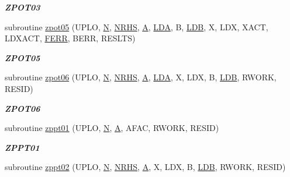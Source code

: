 \begin{DoxyCompactItemize}
\begin{DoxyCompactList}\small\item\em {\bfseries Z\+P\+O\+T03} \end{DoxyCompactList}\item 
subroutine \hyperlink{group__complex16__lin_gad3da0aadacd8621d7118250abd3e0101}{zpot05} (U\+P\+L\+O, \hyperlink{polmisc_8c_a0240ac851181b84ac374872dc5434ee4}{N}, \hyperlink{example__user_8c_aa0138da002ce2a90360df2f521eb3198}{N\+R\+H\+S}, \hyperlink{classA}{A}, \hyperlink{example__user_8c_ae946da542ce0db94dced19b2ecefd1aa}{L\+D\+A}, B, \hyperlink{example__user_8c_a50e90a7104df172b5a89a06c47fcca04}{L\+D\+B}, X, L\+D\+X, X\+A\+C\+T, L\+D\+X\+A\+C\+T, \hyperlink{superlu__enum__consts_8h_af00a42ecad444bbda75cde1b64bd7e72a78fd14d7abebae04095cfbe02928f153}{F\+E\+R\+R}, B\+E\+R\+R, R\+E\+S\+L\+T\+S)
\begin{DoxyCompactList}\small\item\em {\bfseries Z\+P\+O\+T05} \end{DoxyCompactList}\item 
subroutine \hyperlink{group__complex16__lin_gaf4aed77100de1375a28446abc68a3051}{zpot06} (U\+P\+L\+O, \hyperlink{polmisc_8c_a0240ac851181b84ac374872dc5434ee4}{N}, \hyperlink{example__user_8c_aa0138da002ce2a90360df2f521eb3198}{N\+R\+H\+S}, \hyperlink{classA}{A}, \hyperlink{example__user_8c_ae946da542ce0db94dced19b2ecefd1aa}{L\+D\+A}, X, L\+D\+X, B, \hyperlink{example__user_8c_a50e90a7104df172b5a89a06c47fcca04}{L\+D\+B}, R\+W\+O\+R\+K, R\+E\+S\+I\+D)
\begin{DoxyCompactList}\small\item\em {\bfseries Z\+P\+O\+T06} \end{DoxyCompactList}\item 
subroutine \hyperlink{group__complex16__lin_ga6c9d103040986a35816ec49466dbe920}{zppt01} (U\+P\+L\+O, \hyperlink{polmisc_8c_a0240ac851181b84ac374872dc5434ee4}{N}, \hyperlink{classA}{A}, A\+F\+A\+C, R\+W\+O\+R\+K, R\+E\+S\+I\+D)
\begin{DoxyCompactList}\small\item\em {\bfseries Z\+P\+P\+T01} \end{DoxyCompactList}\item 
subroutine \hyperlink{group__complex16__lin_ga7c72b670599cdc4d0986f42c737cf807}{zppt02} (U\+P\+L\+O, \hyperlink{polmisc_8c_a0240ac851181b84ac374872dc5434ee4}{N}, \hyperlink{example__user_8c_aa0138da002ce2a90360df2f521eb3198}{N\+R\+H\+S}, \hyperlink{classA}{A}, X, L\+D\+X, B, \hyperlink{example__user_8c_a50e90a7104df172b5a89a06c47fcca04}{L\+D\+B}, R\+W\+O\+R\+K, R\+E\+S\+I\+D)

\end{DoxyCompactItemize}
